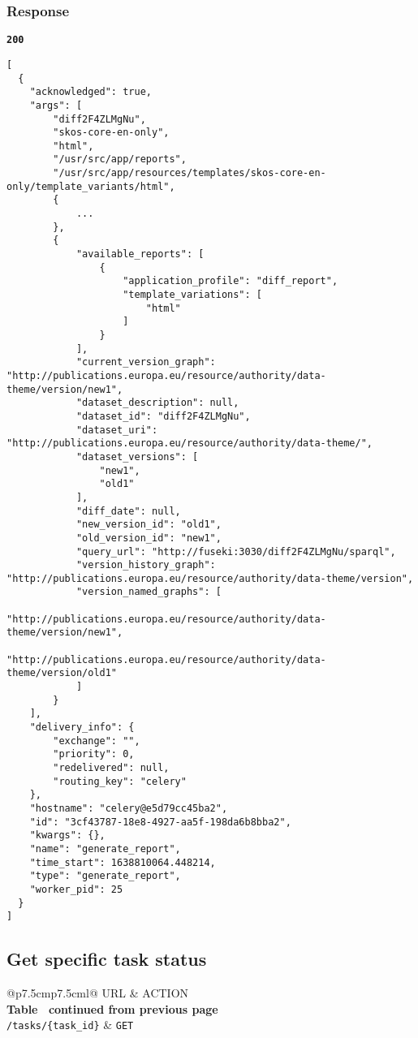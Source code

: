 \subsubsection{Response}
\textbf{\texttt{200}}
\begin{lstlisting}
[
  {
    "acknowledged": true,
    "args": [
        "diff2F4ZLMgNu",
        "skos-core-en-only",
        "html",
        "/usr/src/app/reports",
        "/usr/src/app/resources/templates/skos-core-en-only/template_variants/html",
        {
            ...
        },
        {
            "available_reports": [
                {
                    "application_profile": "diff_report",
                    "template_variations": [
                        "html"
                    ]
                }
            ],
            "current_version_graph": "http://publications.europa.eu/resource/authority/data-theme/version/new1",
            "dataset_description": null,
            "dataset_id": "diff2F4ZLMgNu",
            "dataset_uri": "http://publications.europa.eu/resource/authority/data-theme/",
            "dataset_versions": [
                "new1",
                "old1"
            ],
            "diff_date": null,
            "new_version_id": "old1",
            "old_version_id": "new1",
            "query_url": "http://fuseki:3030/diff2F4ZLMgNu/sparql",
            "version_history_graph": "http://publications.europa.eu/resource/authority/data-theme/version",
            "version_named_graphs": [
                "http://publications.europa.eu/resource/authority/data-theme/version/new1",
                "http://publications.europa.eu/resource/authority/data-theme/version/old1"
            ]
        }
    ],
    "delivery_info": {
        "exchange": "",
        "priority": 0,
        "redelivered": null,
        "routing_key": "celery"
    },
    "hostname": "celery@e5d79cc45ba2",
    "id": "3cf43787-18e8-4927-aa5f-198da6b8bba2",
    "kwargs": {},
    "name": "generate_report",
    "time_start": 1638810064.448214,
    "type": "generate_report",
    "worker_pid": 25
  }
]
\end{lstlisting}

\subsection{Get specific task status}

\begin{longtable}[c]{@{}p{7.5cm}p{7.5cm}l@{}}
  \toprule
  URL                          & ACTION                       \\* \midrule
  \endfirsthead
  \multicolumn{3}{c}%
  {{\bfseries Table \thetable\ continued from previous page}} \\
  \endhead
  \bottomrule
  \endfoot
  \endlastfoot
  \texttt{/tasks/\{task\_id\}} & \texttt{GET}                 \\* \bottomrule
  \label{tab:rdf-differ-get-task}                             \\
\end{longtable}

